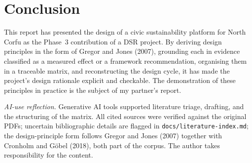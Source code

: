 \documentclass[11pt,a4paper]{article}
\begin{document}
\section{Conclusion}

This report has presented the design of a civic sustainability platform for North Corfu as the Phase~3 contribution of a DSR project. By deriving design principles in the form of Gregor and Jones (2007), grounding each in evidence classified as a measured effect or a framework recommendation, organising them in a traceable matrix, and reconstructing the design cycle, it has made the project's design rationale explicit and checkable. The demonstration of these principles in practice is the subject of my partner's report.

\vspace{0.5em}
\small\emph{AI-use reflection.} Generative AI tools supported literature triage, drafting, and the structuring of the matrix. All cited sources were verified against the original PDFs; uncertain bibliographic details are flagged in \texttt{docs/literature-index.md}; the design-principle form follows Gregor and Jones (2007) together with Cronholm and G\"obel (2018), both part of the corpus. The author takes responsibility for the content.

\newpage
\end{document}
